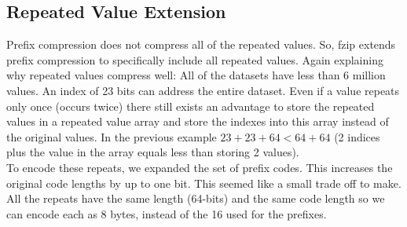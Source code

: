 \subsection{Repeated Value Extension}
Prefix compression does not compress all of the repeated values. So, fzip extends prefix compression to specifically include all repeated values. Again explaining why repeated values compress well: All of the datasets have less than 6 million values. An index of 23 bits can address the entire dataset. Even if a value repeats only once (occurs twice) there still exists an advantage to store the repeated values in a repeated value array and store the indexes into this array instead of the original values. In the previous example $23+23+64<64+64$ (2 indices plus the value in the array equals less than storing 2 values).\\
\indent To encode these repeats, we expanded the set of prefix codes. This increases the original code lengths by up to one bit. This seemed like a small trade off to make. All the repeats have the same length (64-bits) and the same code length so we can encode each as 8 bytes, instead of the 16 used for the prefixes.

